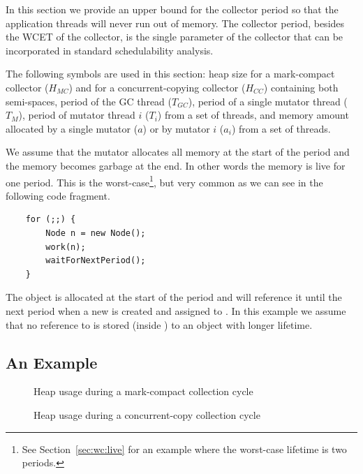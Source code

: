 In this section we provide an upper bound for the collector period
so that the application threads will never run out of memory. The
collector period, besides the WCET of the collector, is the single
parameter of the collector that can be incorporated in standard
schedulability analysis.

The following symbols are used in this section: heap size for a
mark-compact collector ($H_{MC}$) and for a concurrent-copying
collector ($H_{CC}$) containing both semi-spaces, period of the GC
thread ($T_{GC}$), period of a single mutator thread ($T_M$), period
of mutator thread $i$ ($T_i$) from a set of threads, and memory
amount allocated by a single mutator ($a$) or by mutator $i$ ($a_i$)
from a set of threads.

We assume that the mutator allocates all memory at the start of the
period and the memory becomes garbage at the end. In other words the
memory is live for one period. This is the worst-case\footnote{See
Section~\ref{sec:wc:live} for an example where the worst-case
lifetime is two periods.}, but very common as we can see in the
following code fragment.
\begin{samepage}
\begin{lstlisting}
    for (;;) {
        Node n = new Node();
        work(n);
        waitForNextPeriod();
    }
\end{lstlisting}
\end{samepage}
The object  is allocated at the start of the period and
 will reference it until the next period when a new
 is created and assigned to . In this example we
assume that no reference to  is stored (inside
) to an object with longer lifetime.




\subsection{An Example} \label{sec:example}

\begin{figure}
\begin{center}
    
    \caption{Heap usage during a mark-compact collection cycle}
\label{fig:exmc}
\end{center}
\end{figure}

\begin{figure}
\begin{center}
    
    \caption{Heap usage during a concurrent-copy collection cycle}
\label{fig:excc}
\end{center}
\end{figure}


